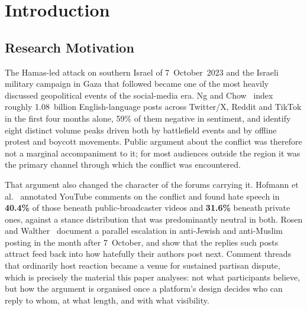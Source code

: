 \documentclass[pdflatex,sn-basic,Numbered,iicol]{sn-jnl}
\begin{document}

\maketitle

\clearpage


\section{Introduction}
\subsection{Research Motivation}
The Hamas-led attack on southern Israel of 7~October~2023 and the Israeli military
campaign in Gaza that followed became one of the most heavily discussed
geopolitical events of the social-media era. Ng and Chow~\cite{ngchow2025} index
roughly 1.08~billion English-language posts across Twitter/X, Reddit and TikTok in
the first four months alone, 59\% of them negative in sentiment, and identify eight
distinct volume peaks driven both by battlefield events and by offline protest and
boycott movements. Public argument about the conflict was therefore not a marginal
accompaniment to it; for most audiences outside the region it was the primary
channel through which the conflict was encountered.

That argument also changed the character of the forums carrying it. Hofmann
et al.~\cite{hofmann2026} annotated YouTube comments on the conflict and found
hate speech in \textbf{40.4\%} of those beneath public-broadcaster videos and
\textbf{31.6\%} beneath private ones, against a stance distribution that was
predominantly neutral in both. Rosen and Walther~\cite{rosen2025} document a
parallel escalation in anti-Jewish and anti-Muslim posting in the month after
7~October, and show that the replies such posts attract feed back into how
hatefully their authors post next.
Comment threads that ordinarily host reaction became a venue for
sustained partisan dispute, which is precisely the material this paper analyses:
not what participants believe, but how the argument is organised once a platform's
design decides who can reply to whom, at what length, and with what visibility.
\end{document}

